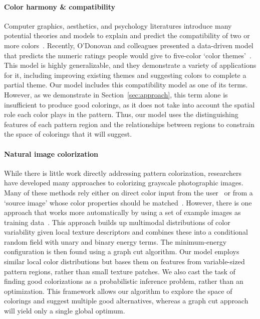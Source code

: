 \paragraph{Color harmony \& compatibility}
Computer graphics, aesthetics, and psychology literatures introduce many potential theories and models to explain and predict the compatibility of two or more colors~\cite{CohenOrHarmonization,Munsell,PalmerColorPreference}. Recently, O'Donovan and colleagues presented a data-driven model that predicts the numeric ratings people would give to five-color `color themes'~. This model is highly generalizable, and they demonstrate a variety of applications for it, including improving existing themes and suggesting colors to complete a partial theme. Our model includes this compatibility model as one of its terms. However, as we demonstrate in Section~\ref{sec:approach}, this term alone is insufficient to produce good colorings, as it does not take into account the spatial role each color plays in the pattern. Thus, our model uses the distinguishing features of each pattern region and the relationships between regions to constrain the space of colorings that it will suggest.

\paragraph{Natural image colorization}
While there is little work directly addressing pattern colorization, researchers have developed many approaches to colorizing grayscale photographic images. Many of these methods rely either on direct color input from the user~\cite{ScribbleColorization} or from a `source image' whose color properties should be matched~\cite{TransferColorization}. However, there is one approach that works more automatically by using a set of example images as training data~\cite{MultimodalColorization}. This approach builds up multimodal distributions of color variability given local texture descriptors and combines these into a conditional random field with unary and binary energy terms. The minimum-energy configuration is then found using a graph cut algorithm. Our model employs similar local color distributions but bases them on features from variable-sized pattern regions, rather than small texture patches. We also cast the task of finding good colorizations as a probabilistic inference problem, rather than an optimization. This framework allows our algorithm to explore the space of colorings and suggest multiple good alternatives, whereas a graph cut approach will yield only a single global optimum.

